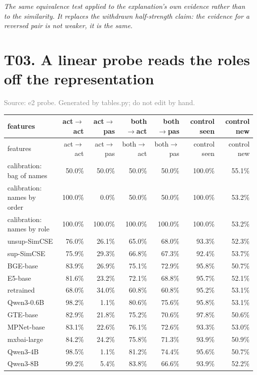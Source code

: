 \documentclass[10pt]{article}
\begin{document}
\textit{The same equivalence test applied to the explanation's own evidence rather than to the similarity. It replaces the withdrawn half-strength claim: the evidence for a reversed pair is not weaker, it is the same.}
\clearpage

\section*{T03. A linear probe reads the roles off the representation}
\textcolor{gray}{Source: e2 probe. Generated by tables.py; do not edit by hand.}

\footnotesize
\begin{longtable}{lrrrrrr}
\toprule
features & act$\rightarrow$act & act$\rightarrow$pas & both$\rightarrow$act & both$\rightarrow$pas & control seen & control new \\
\midrule
\endfirsthead
\toprule
features & act$\rightarrow$act & act$\rightarrow$pas & both$\rightarrow$act & both$\rightarrow$pas & control seen & control new \\
\midrule
\endhead
\bottomrule
\endfoot
calibration: bag of names & 50.0\% & 50.0\% & 50.0\% & 50.0\% & 100.0\% & 55.1\% \\
calibration: names by order & 100.0\% & 0.0\% & 50.0\% & 50.0\% & 100.0\% & 53.2\% \\
calibration: names by role & 100.0\% & 100.0\% & 100.0\% & 100.0\% & 100.0\% & 53.2\% \\
unsup-SimCSE & 76.0\% & 26.1\% & 65.0\% & 68.0\% & 93.3\% & 52.3\% \\
sup-SimCSE & 75.9\% & 29.3\% & 66.8\% & 67.3\% & 92.4\% & 53.7\% \\
BGE-base & 83.9\% & 26.9\% & 75.1\% & 72.9\% & 95.8\% & 50.7\% \\
E5-base & 81.6\% & 23.2\% & 72.1\% & 68.8\% & 95.7\% & 52.1\% \\
retrained & 68.0\% & 34.0\% & 60.8\% & 60.8\% & 95.2\% & 53.1\% \\
Qwen3-0.6B & 98.2\% & 1.1\% & 80.6\% & 75.6\% & 95.8\% & 53.1\% \\
GTE-base & 82.9\% & 21.8\% & 75.2\% & 70.6\% & 97.8\% & 50.6\% \\
MPNet-base & 83.1\% & 22.6\% & 76.1\% & 72.6\% & 93.3\% & 53.0\% \\
mxbai-large & 84.2\% & 24.2\% & 75.8\% & 71.3\% & 93.9\% & 50.9\% \\
Qwen3-4B & 98.5\% & 1.1\% & 81.2\% & 74.4\% & 95.6\% & 50.7\% \\
Qwen3-8B & 99.2\% & 5.4\% & 83.8\% & 66.6\% & 93.9\% & 52.2\% \\
\end{longtable}
\normalsize
\end{document}
